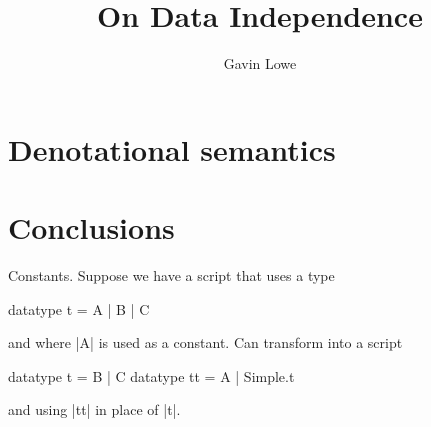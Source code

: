 \documentclass[12pt,a4paper]{article}
\title{On Data Independence}
\author{Gavin Lowe}
\begin{document}
\maketitle




\section{Denotational semantics}

\section{Conclusions}

Constants.  Suppose we have a script that uses a type
\begin{cspm}
datatype t = A | B | C
\end{cspm}
and where |A| is used as a constant.
Can transform into a script 
\begin{cspm}
datatype t = B | C
datatype tt = A | Simple.t
\end{cspm}
and using |tt| in place of |t|.

\appendix


\end{document}
